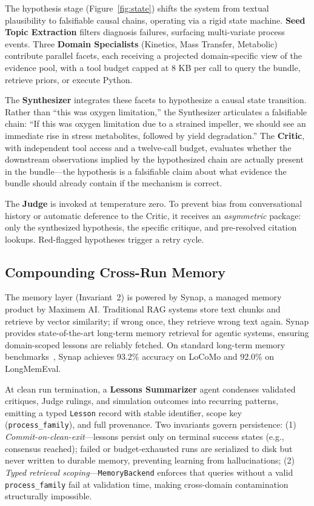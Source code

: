 \documentclass[11pt]{article}
\begin{document}
The hypothesis stage (Figure~\ref{fig:state}) shifts the system from textual plausibility to falsifiable causal chains, operating via a rigid state machine. \textbf{Seed Topic Extraction} filters diagnosis failures, surfacing multi-variate process events. Three \textbf{Domain Specialists} (Kinetics, Mass Transfer, Metabolic) contribute parallel facets, each receiving a projected domain-specific view of the evidence pool, with a tool budget capped at 8 KB per call to query the bundle, retrieve priors, or execute Python.

The \textbf{Synthesizer} integrates these facets to hypothesize a causal state transition. Rather than ``this was oxygen limitation,'' the Synthesizer articulates a falsifiable chain: ``If this was oxygen limitation due to a strained impeller, we should see an immediate rise in stress metabolites, followed by yield degradation.'' The \textbf{Critic}, with independent tool access and a twelve-call budget, evaluates whether the downstream observations implied by the hypothesized chain are actually present in the bundle—the hypothesis is a falsifiable claim about what evidence the bundle should already contain if the mechanism is correct.

The \textbf{Judge} is invoked at temperature zero. To prevent bias from conversational history or automatic deference to the Critic, it receives an \emph{asymmetric} package: only the synthesized hypothesis, the specific critique, and pre-resolved citation lookups. Red-flagged hypotheses trigger a retry cycle.

\subsection{Compounding Cross-Run Memory}

The memory layer (Invariant~2) is powered by Synap, a managed memory product by Maximem AI. Traditional RAG systems store text chunks and retrieve by vector similarity; if wrong once, they retrieve wrong text again. Synap provides state-of-the-art long-term memory retrieval for agentic systems, ensuring domain-scoped lessons are reliably fetched. On standard long-term memory benchmarks~\citep{maximem_eval}, Synap achieves 93.2\% accuracy on LoCoMo and 92.0\% on LongMemEval.

At clean run termination, a \textbf{Lessons Summarizer} agent condenses validated critiques, Judge rulings, and simulation outcomes into recurring patterns, emitting a typed \texttt{Lesson} record with stable identifier, scope key (\texttt{process\_family}), and full provenance. Two invariants govern persistence: (1) \emph{Commit-on-clean-exit}—lessons persist only on terminal success states (e.g., consensus reached); failed or budget-exhausted runs are serialized to disk but never written to durable memory, preventing learning from hallucinations; (2) \emph{Typed retrieval scoping}—\texttt{MemoryBackend} enforces that queries without a valid \texttt{process\_family} fail at validation time, making cross-domain contamination structurally impossible.
\end{document}
